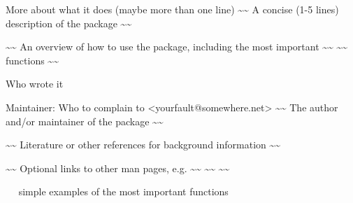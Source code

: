 \begin{Description}\relax
More about what it does (maybe more than one line)
\textasciitilde{}\textasciitilde{} A concise (1-5 lines) description of the package \textasciitilde{}\textasciitilde{}
\end{Description}
\begin{Details}\relax
{}
\textasciitilde{}\textasciitilde{} An overview of how to use the package, including the most important \textasciitilde{}\textasciitilde{}
\textasciitilde{}\textasciitilde{} functions \textasciitilde{}\textasciitilde{}
\end{Details}
\begin{Author}\relax
Who wrote it

Maintainer: Who to complain to \textless{}yourfault@somewhere.net\textgreater{}
\textasciitilde{}\textasciitilde{} The author and/or maintainer of the package \textasciitilde{}\textasciitilde{}
\end{Author}
\begin{References}\relax
\textasciitilde{}\textasciitilde{} Literature or other references for background information \textasciitilde{}\textasciitilde{}
\end{References}
\begin{SeeAlso}\relax
\textasciitilde{}\textasciitilde{} Optional links to other man pages, e.g. \textasciitilde{}\textasciitilde{}
\textasciitilde{}\textasciitilde{}  \textasciitilde{}\textasciitilde{}
\end{SeeAlso}
\begin{Examples}
\begin{ExampleCode}
~~ simple examples of the most important functions ~~
\end{ExampleCode}
\end{Examples}

